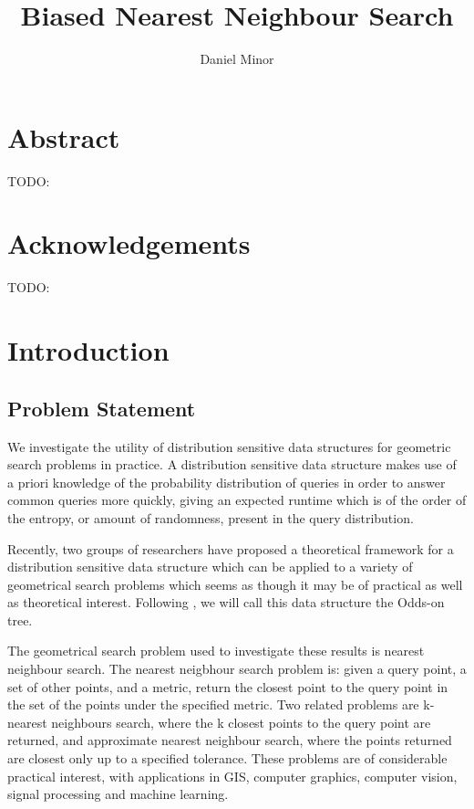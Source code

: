 \documentclass[mcs]{scsthesis}
\title {Biased Nearest Neighbour Search}
\author {Daniel Minor}
\begin{document}
\beforepreface

\prefacesection

\chapter*{Abstract}

TODO:

\chapter*{Acknowledgements}

TODO:

\afterpreface

\chapter{Introduction}

\section{Problem Statement}

We investigate the utility of distribution sensitive data structures for
geometric search problems in practice.  A distribution sensitive data structure
makes use of a priori knowledge of the probability distribution of queries in
order to answer common queries more quickly, giving an expected runtime which
is of the order of the entropy, or amount of randomness, present in the query
distribution.

Recently, two groups of researchers \cite{chan} \cite{oddson} have proposed a
theoretical framework for a distribution sensitive data structure which can be
applied to a variety of geometrical search problems which seems as though it
may be of practical as well as theoretical interest.  Following \cite{oddson},
we will call this data structure the Odds-on tree.

The geometrical search problem used to investigate these results is nearest
neighbour search.  The nearest neigbhour search problem is: given a query
point, a set of other points, and a metric, return the closest point to the
query point in the set of the points under the specified metric.  Two related
problems are k-nearest neighbours search, where the k closest points to the
query point are returned, and approximate nearest neighbour search, where the
points returned are closest only up to a specified tolerance.  These problems
are of considerable practical interest, with applications in GIS, computer
graphics, computer vision, signal processing and machine learning.
\end{document}
